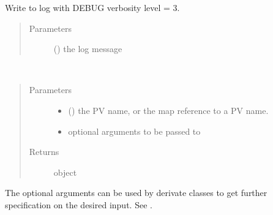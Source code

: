 \documentclass[letterpaper,10pt,english]{sphinxmanual}
\begin{document}

\begin{fulllineitems}
\label{\detokenize{fsm:logD}}
Write to log with DEBUG verbosity level = 3.
\begin{quote}\begin{description}
\item[{Parameters}] \leavevmode
{} () \textendash{} the log message

\end{description}\end{quote}

\end{fulllineitems}


\begin{fulllineitems}
\label{\detokenize{fsm:connect}}~\begin{quote}\begin{description}
\item[{Parameters}] \leavevmode\begin{itemize}
\item {} 
 () \textendash{} the PV name, or the map reference to a PV name.

\item {} 
 \textendash{} optional arguments to be passed to 

\end{itemize}

\item[{Returns}] \leavevmode
{\hyperref[\detokenize{io:fsmIO}]{}} object

\end{description}\end{quote}

The optional arguments can be used by {\hyperref[\detokenize{io:fsmIOs}]{}} derivate classes to
get further specification on the desired input. See {\hyperref[\detokenize{io:io-mapping}]{}}.

\end{fulllineitems}
\end{document}
